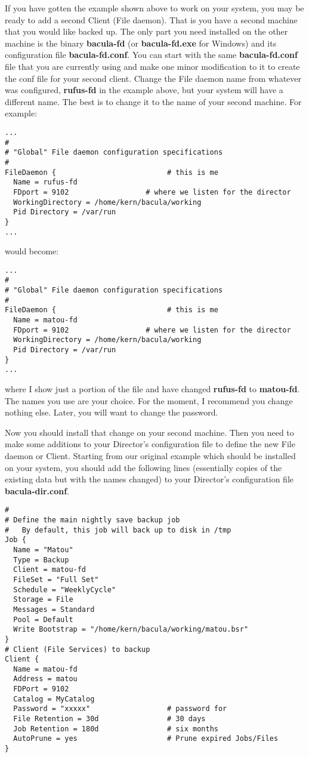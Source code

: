 If you have gotten the example shown above to work on your system, you may be
ready to add a second Client (File daemon). That is you have a second machine
that you would like backed up. The only part you need installed on the other
machine is the binary {\bf bacula-fd} (or {\bf bacula-fd.exe} for Windows) and
its configuration file {\bf bacula-fd.conf}. You can start with the same {\bf
bacula-fd.conf} file that you are currently using and make one minor
modification to it to create the conf file for your second client. Change the
File daemon name from whatever was configured, {\bf rufus-fd} in the example
above, but your system will have a different name. The best is to change it to
the name of your second machine. For example: 

\footnotesize
\begin{verbatim}
...
#
# "Global" File daemon configuration specifications
#
FileDaemon {                          # this is me
  Name = rufus-fd
  FDport = 9102                  # where we listen for the director
  WorkingDirectory = /home/kern/bacula/working
  Pid Directory = /var/run
}
...
\end{verbatim}
\normalsize

would become: 

\footnotesize
\begin{verbatim}
...
#
# "Global" File daemon configuration specifications
#
FileDaemon {                          # this is me
  Name = matou-fd
  FDport = 9102                  # where we listen for the director
  WorkingDirectory = /home/kern/bacula/working
  Pid Directory = /var/run
}
...
\end{verbatim}
\normalsize

where I show just a portion of the file and have changed {\bf rufus-fd} to
{\bf matou-fd}. The names you use are your choice. For the moment, I recommend
you change nothing else. Later, you will want to change the password. 

Now you should install that change on your second machine. Then you need to
make some additions to your Director's configuration file to define the new
File daemon or Client. Starting from our original example which should be
installed on your system, you should add the following lines (essentially
copies of the existing data but with the names changed) to your Director's
configuration file {\bf bacula-dir.conf}. 

\footnotesize
\begin{verbatim}
#
# Define the main nightly save backup job
#   By default, this job will back up to disk in /tmp
Job {
  Name = "Matou"
  Type = Backup
  Client = matou-fd
  FileSet = "Full Set"
  Schedule = "WeeklyCycle"
  Storage = File
  Messages = Standard
  Pool = Default
  Write Bootstrap = "/home/kern/bacula/working/matou.bsr"
}
# Client (File Services) to backup
Client {
  Name = matou-fd
  Address = matou
  FDPort = 9102
  Catalog = MyCatalog
  Password = "xxxxx"                  # password for
  File Retention = 30d                # 30 days
  Job Retention = 180d                # six months
  AutoPrune = yes                     # Prune expired Jobs/Files
}
\end{verbatim}
\normalsize

